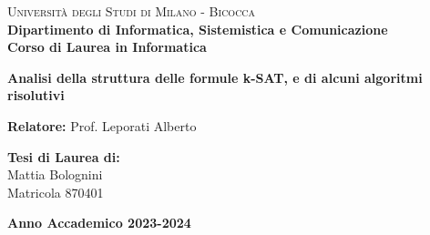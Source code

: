 

    
\begin{titlepage}
    
    \noindent
    \begin{minipage}[t]{0.19\textwidth}
    \end{minipage}
    \hspace{2mm}
    \begin{minipage}[t]{0.70\textwidth}
    {
            {\textsc{Università degli Studi di Milano - Bicocca}} \\
            \textbf{Dipartimento di Informatica, Sistemistica e Comunicazione} \\
            \textbf{Corso di Laurea in Informatica} \\
            \par
    }
    \end{minipage}
    
\vspace{40mm}
    
\begin{center}
        {\LARGE{
                \textbf{Analisi della struttura delle formule k-SAT, e di alcuni algoritmi risolutivi}
                \par
        }}
    \end{center}
    
    \vspace{50mm}

    \noindent
    {\large \textbf{Relatore:} Prof. Leporati Alberto} \\
    
    \vspace{15mm}

    \begin{flushright}
        {\large \textbf{Tesi di Laurea di:}} \\
        \large{Mattia Bolognini} \\
        \large{Matricola 870401} 
    \end{flushright}
    
    \vspace{20mm}
    \begin{center}
        {\large{\bf Anno Accademico 2023-2024}}
    \end{center}

    
\end{titlepage}


